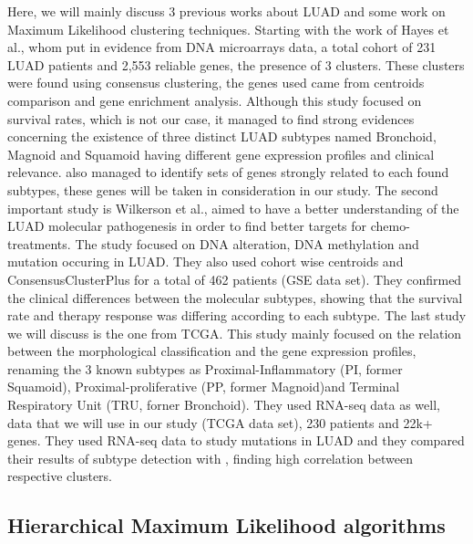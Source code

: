 \documentclass[twocolumn]{article}
\begin{document}
Here, we will mainly discuss 3 previous works about LUAD and some work on Maximum Likelihood clustering techniques.
Starting with the work of Hayes et al.\cite{hayes}, whom put in evidence from DNA microarrays data, a total cohort of 231 LUAD patients and 2,553 reliable genes, the presence of 3 clusters.
These clusters were found using consensus clustering\cite{cons}, the genes used came from centroids comparison and gene enrichment analysis.
Although this study focused on survival rates, which is not our case, it managed to find strong evidences concerning the existence of three distinct LUAD subtypes named Bronchoid, Magnoid and Squamoid having different gene expression profiles and clinical relevance. \cite{hayes} also managed to identify sets of genes strongly related to each found subtypes, these genes will be taken in consideration in our study.
The second important study is Wilkerson et al.\cite{wilk}, aimed to have a better understanding of the LUAD molecular pathogenesis in order to find better targets for chemo-treatments.
The study focused on DNA alteration, DNA methylation and mutation occuring in LUAD.
They also used cohort wise centroids and ConsensusClusterPlus\cite{consensusPlus} for a total of 462 patients (GSE data set).
They confirmed the clinical differences between the molecular subtypes, showing that the survival rate and therapy response was differing according to each subtype.
The last study we will discuss is the one from TCGA\cite{TCGA}.
This study mainly focused on the relation between the morphological classification and the gene expression profiles, renaming the 3 known subtypes as Proximal-Inflammatory (PI, former Squamoid), Proximal-proliferative (PP, former Magnoid)and Terminal Respiratory Unit (TRU, forner Bronchoid).
They used RNA-seq data as well, data that we will use in our study (TCGA data set), 230 patients and 22k+ genes.
They used RNA-seq data to study mutations in LUAD and they compared their results of subtype detection with \cite{wilk}, finding high correlation between respective clusters.

\subsection{Hierarchical Maximum Likelihood algorithms}
\end{document}
